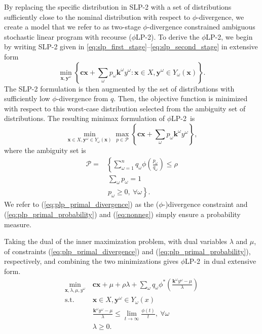 \documentclass[ijoc,letterpaper]{informs3} %
\newcommand{\x}{\mathbf{x}}
\newcommand{\y}{\mathbf{y}}
\renewcommand{\c}{\mathbf{c}}
\renewcommand{\k}{\mathbf{k}}
\newcommand{\st}{\mbox{s.t.}}
\newcommand{\plp}{$\phi$LP-2}
\begin{document}
By replacing the specific distribution in SLP-2 with a set of distributions sufficiently close to the nominal distribution with respect to $\phi$-divergence, we create a model that we refer to as two-stage $\phi$-divergence constrained ambiguous stochastic linear program with recourse (\plp).
To derive the \plp, we begin by writing SLP-2 given in \eqref{eq:slp_first_stage}--\eqref{eq:slp_second_stage} in extensive form
\[
	\min_{\x,\y^\omega} \left\{ \c\x + \sum_\omega p_\omega \k^\omega y^\omega : \x \in X, \y^\omega \in Y_\omega(\x) \right\}.
\]
The SLP-2 formulation is then augmented by the set of distributions with sufficiently low $\phi$-divergence from $q$.
Then, the objective function is minimized with respect to this worst-case distribution selected from the ambiguity set of distributions.
The resulting minimax formulation of \plp\ is
\begin{equation}
	\min_{\x \in X, \y^\omega \in Y_\omega(\x)} \max_{p \in \mathcal{P}} \left\{ \c\x + \sum_\omega p_\omega \k^\omega y^\omega \right\}, \label{eq:plp_primal}
\end{equation}
where the ambiguity set is
\begin{align}
	\mathcal{P} = & \left\{ \sum_{\omega = 1}^n q_\omega \phi\left(\frac{p_\omega}{q_\omega}\right) \leq \rho \right. \label{eq:plp_primal_divergence} \\
	& \ \sum_\omega p_\omega = 1 \label{eq:plp_primal_probability} \\
	& \ \left. p_\omega \geq 0,\ \forall \omega \right\}. \label{eq:nonneg}
\end{align}
We refer to (\ref{eq:plp_primal_divergence}) as the ($\phi$-)divergence constraint and (\ref{eq:plp_primal_probability}) and (\ref{eq:nonneg}) simply ensure a probability measure.

Taking the dual of the inner maximization problem, with dual variables $\lambda$ and $\mu$, of constraints (\ref{eq:plp_primal_divergence}) and (\ref{eq:plp_primal_probability}), respectively, and combining the two minimizations gives \plp\ in dual extensive form.
\begin{align*}
	\min_{\x,\lambda,\mu,y^\omega} \ & \c\x + \mu + \rho \lambda + \sum_\omega q_\omega \phi^*\left(\frac{\k^\omega y^\omega - \mu}{\lambda}\right) \\
	\st \ & \x \in X, \y^\omega \in Y_\omega(x) \nonumber \\
	& \frac{\k^\omega y^\omega - \mu}{\lambda} \leq \lim_{t \rightarrow \infty} \frac{\phi(t)}{t}, \ \forall \omega \\
	& \lambda \geq 0.
\end{align*}
\end{document}
